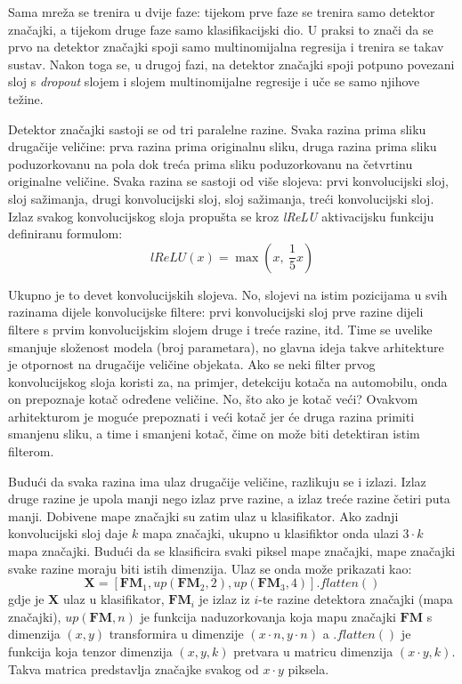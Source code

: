 \documentclass[times, utf8, diplomski, numeric]{fer}
\begin{document}
Sama mreža se trenira u dvije faze: tijekom prve faze se trenira samo detektor značajki, a tijekom druge faze samo klasifikacijski dio. U praksi to znači da se prvo na detektor značajki spoji samo multinomijalna regresija i trenira se takav sustav. Nakon toga se, u drugoj fazi, na detektor značajki spoji potpuno povezani sloj s \emph{dropout} slojem i slojem multinomijalne regresije i uče se samo njihove težine.

Detektor značajki sastoji se od tri paralelne razine. Svaka razina prima sliku drugačije veličine: prva razina prima originalnu sliku, druga razina prima sliku poduzorkovanu na pola dok treća prima sliku poduzorkovanu na četvrtinu originalne veličine. Svaka razina se sastoji od više slojeva: prvi konvolucijski sloj, sloj sažimanja, drugi konvolucijski sloj, sloj sažimanja, treći konvolucijski sloj. Izlaz svakog konvolucijskog sloja propušta se kroz \textit{lReLU} aktivacijsku funkciju definiranu formulom:
\begin{equation}
  lReLU( x ) = \max(x,\ \frac{1}{5} x)
\end{equation}

Ukupno je to devet konvolucijskih slojeva. No, slojevi na istim pozicijama u svih razinama dijele konvolucijske filtere: prvi konvolucijski sloj prve razine dijeli filtere s prvim konvolucijskim slojem druge i treće razine, itd. Time se uvelike smanjuje složenost modela (broj parametara), no glavna ideja takve arhitekture je otpornost na drugačije veličine objekata. Ako se neki filter prvog konvolucijskog sloja koristi za, na primjer, detekciju kotača na automobilu, onda on prepoznaje kotač određene veličine. No, što ako je kotač veći? Ovakvom arhitekturom je moguće prepoznati i veći kotač jer će druga razina primiti smanjenu sliku, a time i smanjeni kotač, čime on može biti detektiran istim filterom.

Budući da svaka razina ima ulaz drugačije veličine, razlikuju se i izlazi. Izlaz druge razine je upola manji nego izlaz prve razine, a izlaz treće razine četiri puta manji. Dobivene mape značajki su zatim ulaz u klasifikator. Ako zadnji konvolucijski sloj daje $k$ mapa značajki, ukupno u klasifiktor onda ulazi $3 \cdot k$ mapa značajki. Budući da se klasificira svaki piksel mape značajki, mape značajki svake razine moraju biti istih dimenzija. Ulaz se onda može prikazati kao:
\begin{equation}
	\boldsymbol{X} = [\boldsymbol{FM}_1, up(\boldsymbol{FM}_2, 2), up(\boldsymbol{FM}_3, 4)].flatten()
\end{equation}
gdje je $\boldsymbol{X}$ ulaz u klasifikator, $\boldsymbol{FM}_i$ je izlaz iz $i$-te razine detektora značajki (mapa značajki), $up(\boldsymbol{FM}, n)$ je funkcija naduzorkovanja koja mapu značajki $\boldsymbol{FM}$ s dimenzija $(x, y)$ transformira u dimenzije $(x \cdot n, y\cdot n)$ a $.flatten()$ je funkcija koja tenzor dimenzija $(x, y, k)$ pretvara u matricu dimenzija $(x \cdot y, k)$. Takva matrica predstavlja značajke svakog od $x \cdot y$ piksela.
\end{document}
